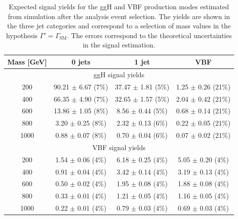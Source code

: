 \begin{table}[htb]
\begin{center}
\caption{Expected signal yields for the ggH and VBF production modes estimated from simulation after the analysis event selection. The yields are shown in the three jet categories and correspond to a selection of mass values in the hypothesis $\Gamma' = \Gamma_\mathrm{SM}$. The errors correspond to the theoretical uncertainties in the signal estimation.}\label{tab:sig_yields}
\small{\begin{tabular}{c c c c } 
\toprule
                 Mass [GeV]                 &          0 jets    &          1 jet              & VBF           \\ 
\midrule
\multicolumn{4}{c}{ggH signal yields} \\
\midrule
 200                        &      90.21 $\pm$       6.67 (7\%)             &      37.47 $\pm$       1.81 (5\%)     &       1.25 $\pm$       0.26 (21\%)      \\
 400                        &      66.35 $\pm$       4.90 (7\%)             &      32.65 $\pm$       1.57 (5\%)     &       2.04 $\pm$       0.42 (21\%)      \\
 600                        &      13.86 $\pm$       1.05 (8\%)             &       8.56 $\pm$       0.44 (5\%)     &       0.68 $\pm$       0.14 (21\%)      \\
 800                        &       3.20 $\pm$       0.25 (8\%)             &       2.32 $\pm$       0.13 (6\%)     &       0.22 $\pm$       0.05 (21\%)      \\
 1000                       &       0.88 $\pm$       0.07 (8\%)             &       0.70 $\pm$       0.04 (6\%)     &       0.07 $\pm$       0.02 (21\%)      \\
\midrule
\multicolumn{4}{c}{VBF signal yields} \\
\midrule
 200                        &       1.54 $\pm$       0.06 (4\%)             &       6.18 $\pm$       0.25 (4\%)     &       5.05 $\pm$       0.20 (4\%)      \\
 400                        &       0.91 $\pm$       0.04 (4\%)             &       3.42 $\pm$       0.14 (4\%)     &       3.19 $\pm$       0.13 (4\%)      \\
 600                        &       0.50 $\pm$       0.02 (4\%)             &       1.95 $\pm$       0.08 (4\%)     &       1.88 $\pm$       0.08 (4\%)      \\
 800                        &       0.33 $\pm$       0.01 (4\%)             &       1.21 $\pm$       0.05 (4\%)     &       1.16 $\pm$       0.05 (4\%)      \\
 1000                       &       0.22 $\pm$       0.01 (4\%)             &       0.79 $\pm$       0.03 (4\%)     &       0.69 $\pm$       0.03 (4\%)      \\
\bottomrule
\end{tabular}
}
\end{center}
\end{table}

